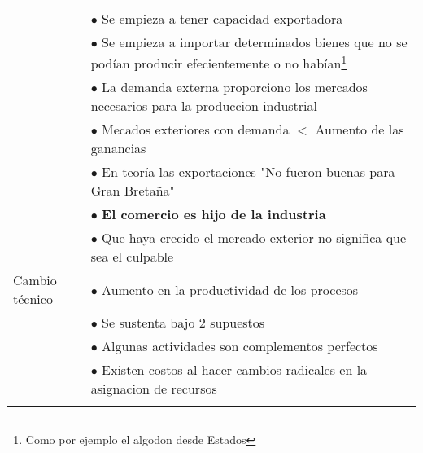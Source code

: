 \begin{tabular}{p{3cm}|p{12cm}}
                               & \hspace{1cm} $\bullet$ Se empieza a tener capacidad exportadora                                                                                                           \\
                               & \hspace{1cm} $\bullet$ Se empieza a importar determinados bienes que no se podían producir efecientemente o no habían\footnote{Como por ejemplo el algodon desde Estados} \\
                               & $\bullet$ La demanda externa proporciono los mercados necesarios para la produccion industrial                                                                            \\
                               & $\bullet$ Mecados exteriores con demanda $<$ Aumento de las ganancias                                                                                                     \\
                               & $\bullet$ En teoría las exportaciones "No fueron buenas para Gran Bretaña"                                                                                                \\
                               & $\bullet$ {\bf El comercio es hijo de la industria}                                                                                                                       \\
                               & $\bullet$ Que haya crecido el mercado exterior no significa que sea el culpable                                                                                           \\ \hline
  Cambio    técnico            & $\bullet$ Aumento en la productividad de los procesos                                                                                                                     \\
                               & $\bullet$ Se sustenta bajo 2 supuestos                                                                                                                                    \\
                               & \hspace{1cm} $\bullet$ Algunas actividades son complementos perfectos                                                                                                     \\
                               & \hspace{1cm} $\bullet$ Existen costos al hacer cambios radicales en la asignacion de recursos                                                                             \\                                                                                  \\

\end{tabular}
